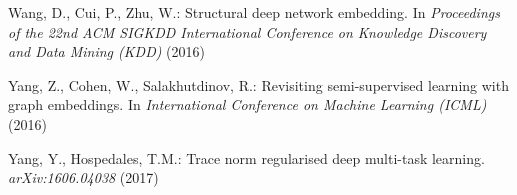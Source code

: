 \documentclass{article}
\begin{document}
\begin{thebibliography}{99}
Wang, D., Cui, P., Zhu, W.:
Structural deep network embedding.
In \emph{Proceedings of the 22nd ACM SIGKDD International Conference on Knowledge Discovery and Data Mining (KDD)} (2016)

Yang, Z., Cohen, W., Salakhutdinov, R.:
Revisiting semi-supervised learning with graph embeddings.
In \emph{International Conference on Machine Learning (ICML)} (2016)

Yang, Y., Hospedales, T.M.:
Trace norm regularised deep multi-task learning.
\emph{arXiv:1606.04038} (2017)

\end{thebibliography}
\end{document}
